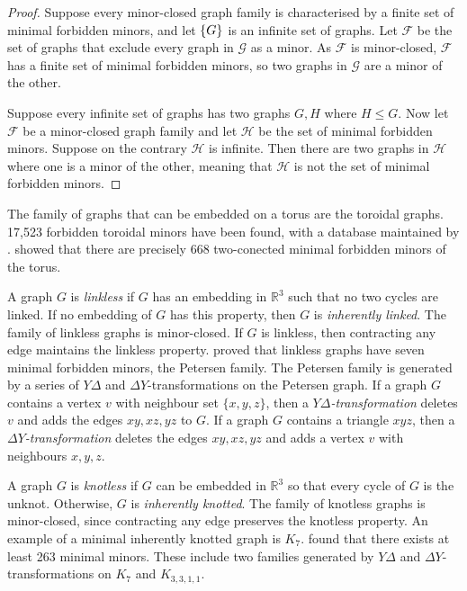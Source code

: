 \begin{proof}
	Suppose every minor-closed graph family is characterised by a finite set of minimal forbidden minors, and let $\mathcal\{G\}$ is an infinite set of graphs. Let $\mathcal{F}$ be the set of graphs that exclude every graph in $\mathcal{G}$ as a minor. As $\mathcal{F}$ is minor-closed, $\mathcal{F}$ has a finite set of minimal forbidden minors, so two graphs in $\mathcal{G}$ are a minor of the other. 

	Suppose every infinite set of graphs has two graphs $G, H$ where $H \leq G$. Now let $\mathcal{F}$ be a minor-closed graph family and let $\mathcal{H}$ be the set of minimal forbidden minors. Suppose on the contrary $\mathcal{H}$ is infinite. Then there are two graphs in $\mathcal{H}$ where one is a minor of the other, meaning that $\mathcal{H}$ is not the set of minimal forbidden minors.
\end{proof}

The family of graphs that can be embedded on a torus are the toroidal graphs. 17,523 forbidden toroidal minors have been found, with a database maintained by \textcite{myrvoldLargeSetTorus2018}. \textcite{moharExcludedMinorsKlein2024} showed that there are precisely $668$ two-conected minimal forbidden minors of the torus.

A graph $G$ is \textit{linkless} if $G$ has an embedding in $\mathbb{R}^3$ such that no two cycles are linked. If no embedding of $G$ has this property, then $G$ is \textit{inherently linked}. The family of linkless graphs is minor-closed. If $G$ is linkless, then contracting any edge maintains the linkless property. \textcite{robertsonSachsLinklessEmbedding1995} proved that linkless graphs have seven minimal forbidden minors, the Petersen family. The Petersen family is generated by a series of $Y \Delta$ and $\Delta Y$-transformations on the Petersen graph. If a graph $G$ contains a vertex $v$ with neighbour set $\{x,y,z\}$, then a \textit{$Y \Delta$-transformation} deletes $v$ and adds the edges $xy,xz, yz$ to $G$. If a graph $G$ contains a triangle $xyz$, then a \textit{$\Delta Y$-transformation} deletes the edges $xy, xz, yz$ and adds a vertex $v$ with neighbours $x, y, z$. 

A graph $G$ is \textit{knotless} if $G$ can be embedded in $\mathbb{R}^3$ so that every cycle of $G$ is the unknot. Otherwise, $G$ is \textit{inherently knotted}. The family of knotless graphs is minor-closed, since contracting any edge preserves the knotless property. An example of a minimal inherently knotted graph is $K_7$. \textcite{goldbergManyManyMore2014} found that there exists at least 263 minimal minors. These include two families generated by $Y \Delta$ and $\Delta Y$-transformations on $K_7$ and $K_{3,3,1,1}$. 

